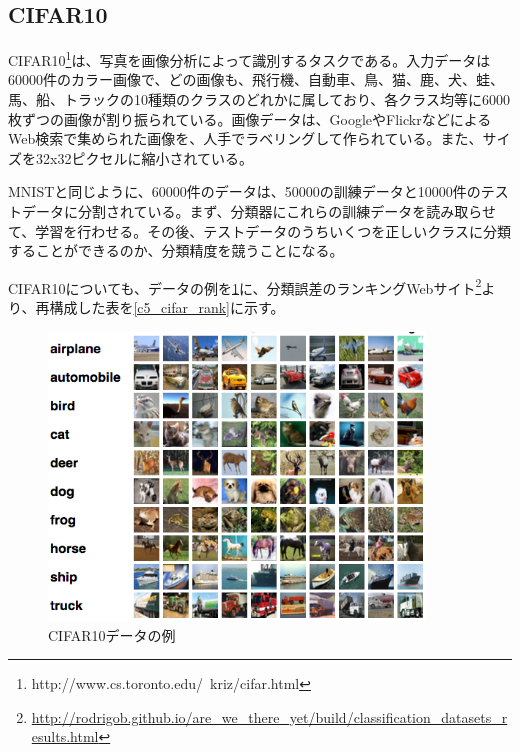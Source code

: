\subsection{CIFAR10}
CIFAR10\footnote{http://www.cs.toronto.edu/~kriz/cifar.html}は、写真を画像分析によって識別するタスクである\cite{krizhevsky2009learning}。入力データは60000件のカラー画像で、どの画像も、飛行機、自動車、鳥、猫、鹿、犬、蛙、馬、船、トラックの10種類のクラスのどれかに属しており、各クラス均等に6000枚ずつの画像が割り振られている。画像データは、GoogleやFlickrなどによるWeb検索で集められた画像を、人手でラベリングして作られている。また、サイズを32x32ピクセルに縮小されている。\par
MNISTと同じように、60000件のデータは、50000の訓練データと10000件のテストデータに分割されている。まず、分類器にこれらの訓練データを読み取らせて、学習を行わせる。その後、テストデータのうちいくつを正しいクラスに分類することができるのか、分類精度を競うことになる。\par
CIFAR10についても、データの例を\ref{c5_cifar_ex}に、分類誤差のランキングWebサイト\footnote{\url{http://rodrigob.github.io/are_we_there_yet/build/classification_datasets_results.html}}より、再構成した表を\ref{c5_cifar_rank}に示す。
\begin{figure}[tbp]
 \begin{center}
  \includegraphics[width=100mm]{img/c5/cifar_ex}
 \end{center}
 \caption{CIFAR10データの例}
 \label{c5_cifar_ex}
\end{figure}

